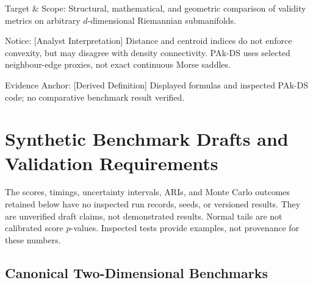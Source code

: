 \begin{landscape}
\begin{table}[htbp]
\begin{threeparttable}
\begin{tablenotes}[flushleft]
        \footnotesize
      \item Target \& Scope: Structural, mathematical, and geometric
        comparison of validity metrics on arbitrary $d$-dimensional
        Riemannian submanifolds.
      \item Notice: [Analyst Interpretation] Distance and centroid
        indices do not enforce convexity, but may disagree with density
        connectivity. PAk-DS uses selected neighbour-edge proxies,
        not exact continuous Morse saddles.
      \item Evidence Anchor: [Derived Definition] Displayed formulas
        and inspected PAk-DS code; no comparative benchmark result verified.
      \end{tablenotes}
    \end{threeparttable}
  \end{table}
\end{landscape}
\section{Synthetic Benchmark Drafts and Validation Requirements}
\label{sec:clustering_benchmarks}

\begin{remark}
  The scores, timings, uncertainty intervals, ARIs, and Monte Carlo
  outcomes retained below have no inspected run records, seeds, or
  versioned results. They are unverified draft claims, not demonstrated
  results. Normal tails are not calibrated score $p$-values. Inspected
  tests provide examples, not provenance for these numbers.
\end{remark}

\subsection{Canonical Two-Dimensional Benchmarks}
\label{subsec:canonical_benchmarks}

